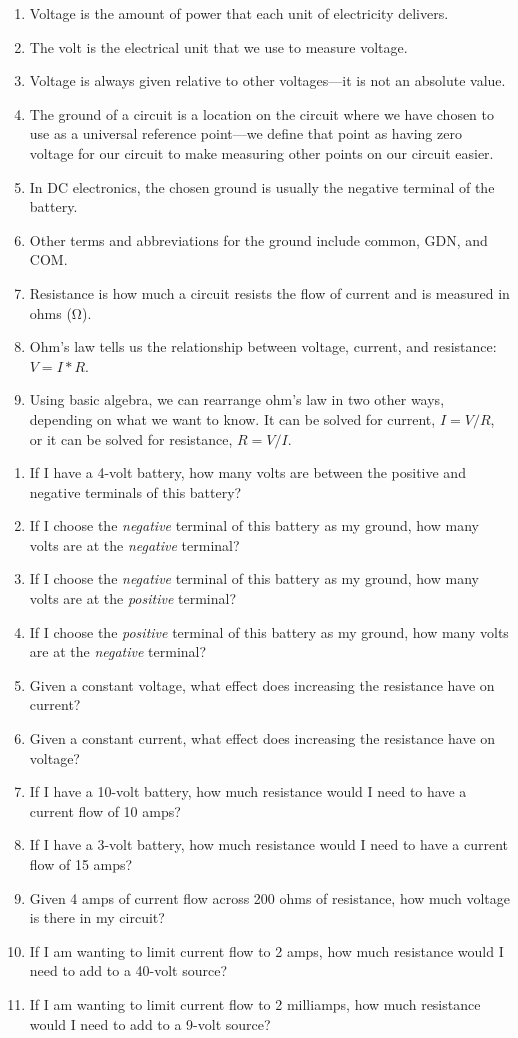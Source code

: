 \begin{enumerate}
\item Voltage is the amount of power that each unit of electricity delivers.
\item The volt is the electrical unit that we use to measure voltage.
\item Voltage is always given relative to other voltages---it is not an absolute value.
\item The ground of a circuit is a location on the circuit where we have chosen to use as a universal reference point---we define that point as having zero voltage for our circuit to make measuring other points on our circuit easier.
\item In DC electronics, the chosen ground is usually the negative terminal of the battery.
\item Other terms and abbreviations for the ground include common, GDN, and COM.
\item Resistance is how much a circuit resists the flow of current and is measured in ohms (\si{\ohm}).
\item Ohm's law tells us the relationship between voltage, current, and resistance: $V = I * R$.
\item Using basic algebra, we can rearrange ohm's law in two other ways, depending on what we want to know.  It can be solved for current, $I = V /R$, or it can be solved for resistance, $R = V / I$.
\end{enumerate}

\applysection

\begin{enumerate}
\item If I have a 4-volt battery, how many volts are between the positive and negative terminals of this battery?
\item If I choose the \emph{negative} terminal of this battery as my ground, how many volts are at the \emph{negative} terminal?
\item If I choose the \emph{negative} terminal of this battery as my ground, how many volts are at the \emph{positive} terminal?
\item If I choose the \emph{positive} terminal of this battery as my ground, how many volts are at the \emph{negative} terminal?
\item Given a constant voltage, what effect does increasing the resistance have on current?
\item Given a constant current, what effect does increasing the resistance have on voltage?
\item If I have a 10-volt battery, how much resistance would I need to have a current flow of 10 amps?
\item If I have a 3-volt battery, how much resistance would I need to have a current flow of 15 amps?
\item Given 4 amps of current flow across 200 ohms of resistance, how much voltage is there in my circuit?
\item If I am wanting to limit current flow to 2 amps, how much resistance would I need to add to a 40-volt source?
\item If I am wanting to limit current flow to 2 milliamps, how much resistance would I need to add to a 9-volt source?
\end{enumerate}
